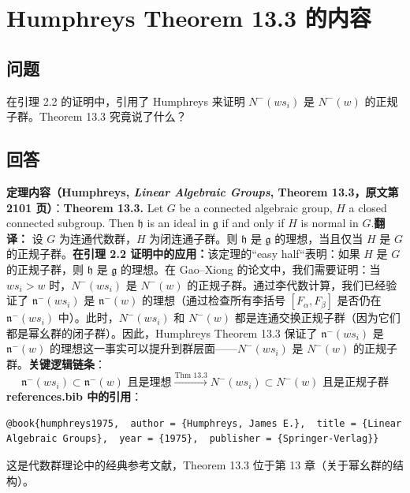 \section{Humphreys Theorem 13.3 的内容}\label{sec:HumphreysThm13}
\subsection{问题}
在引理 2.2 的证明中，引用了 Humphreys \cite[Theorems 13.1 and 13.3]{humphreys1975} 来证明 $N^-(ws_i)$ 是 $N^-(w)$ 的正规子群。Theorem 13.3 究竟说了什么？
\subsection{回答}
\textbf{定理内容（Humphreys, \textit{Linear Algebraic Groups}, Theorem 13.3，原文第 2101 页）}：\textbf{Theorem 13.3.} Let $G$ be a connected algebraic group, $H$ a closed connected subgroup. Then $\mathfrak{h}$ is an ideal in $\mathfrak{g}$ if and only if $H$ is normal in $G$.\bigskip\textbf{翻译：} 设 $G$ 为连通代数群，$H$ 为闭连通子群。则 $\mathfrak{h}$ 是 $\mathfrak{g}$ 的理想，当且仅当 $H$ 是 $G$ 的正规子群。\textbf{在引理 2.2 证明中的应用：}该定理的``easy half``表明：如果 $H$ 是 $G$ 的正规子群，则 $\mathfrak{h}$ 是 $\mathfrak{g}$ 的理想。在 Gao--Xiong \cite{GX2025} 的论文中，我们需要证明：当 $ws_i > w$ 时，$N^-(ws_i)$ 是 $N^-(w)$ 的正规子群。通过李代数计算，我们已经验证了 $\mathfrak{n}^-(ws_i)$ 是 $\mathfrak{n}^-(w)$ 的理想（通过检查所有李括号 $[F_\alpha, F_\beta]$ 是否仍在 $\mathfrak{n}^-(ws_i)$ 中）。此时，$N^-(ws_i)$ 和 $N^-(w)$ 都是连通交换正规子群（因为它们都是幂幺群的闭子群）。因此，Humphreys Theorem 13.3 保证了 $\mathfrak{n}^-(ws_i)$ 是 $\mathfrak{n}^-(w)$ 的理想这一事实可以提升到群层面——$N^-(ws_i)$ 是 $N^-(w)$ 的正规子群。\textbf{关键逻辑链条}：$$\mathfrak{n}^-(ws_i) \subset \mathfrak{n}^-(w) \text{ 且是理想} \xrightarrow{\text{Thm 13.3}} N^-(ws_i) \subset N^-(w) \text{ 且是正规子群}$$\textbf{references.bib 中的引用}：
\begin{verbatim}@book{humphreys1975,  author = {Humphreys, James E.},  title = {Linear Algebraic Groups},  year = {1975},  publisher = {Springer-Verlag}}
\end{verbatim}这是代数群理论中的经典参考文献，Theorem 13.3 位于第 13 章（关于幂幺群的结构）。
